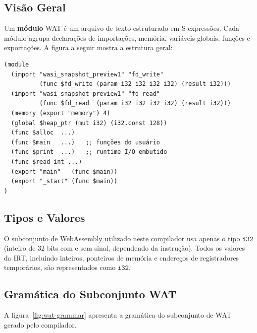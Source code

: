 \subsection{Visão Geral}

Um \textbf{módulo} WAT é um arquivo de texto estruturado em S-expressões.  Cada
módulo agrupa declarações de importações, memória, variáveis globais, funções e
exportações.  A figura a seguir mostra a estrutura geral:

\begin{verbatim}
(module
  (import "wasi_snapshot_preview1" "fd_write"
          (func $fd_write (param i32 i32 i32 i32) (result i32)))
  (import "wasi_snapshot_preview1" "fd_read"
          (func $fd_read  (param i32 i32 i32 i32) (result i32)))
  (memory (export "memory") 4)
  (global $heap_ptr (mut i32) (i32.const 128))
  (func $alloc  ...)
  (func $main   ...)   ;; funções do usuário
  (func $print  ...)   ;; runtime I/O embutido
  (func $read_int ...)
  (export "main"   (func $main))
  (export "_start" (func $main))
)
\end{verbatim}

\subsection{Tipos e Valores}

O subconjunto de WebAssembly utilizado neste compilador usa apenas o tipo
$\mathtt{i32}$ (inteiro de 32 bits com e sem sinal, dependendo da instrução).
Todos os valores da IRT, incluindo inteiros, ponteiros de memória e endereços de
registradores temporários, são representados como $\mathtt{i32}$.

\subsection{Gramática do Subconjunto WAT}\label{subsec:wat-grammar}

A figura~\ref{fig:wat-grammar} apresenta a gramática do subconjunto de WAT
gerado pelo compilador.

